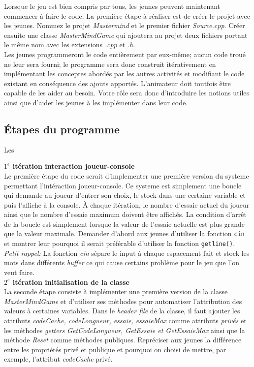 \documentclass[]{report}
\begin{document}
\begin{adjustwidth}{1.5cm}{0cm}
Lorsque le jeu est bien compris par tous, les jeunes peuvent maintenant commencer à faire le code. La première étape à réaliser est de créer le projet avec les jeunes. Nommez le projet \textit{Mastermind} et le premier fichier \textit{Source.cpp}. Créer ensuite une classe \textit{MasterMindGame} qui ajoutera au projet deux fichiers portant le même nom avec les extensions \textit{.cpp} et \textit{.h}.
\\

Les jeunes programmeront le code entièrement par eux-même; aucun code troué ne leur sera fourni; le programme sera donc construit itérativement en implémentant les conceptes abordés par les autres activités et modifiant le code existant en conséquence des ajouts apportés. L'animateur doit toutfois être capable de les aider au besoin. Votre rôle sera donc d'introduire les notions utiles ainsi que d'aider les jeunes à les implémenter dans leur code. 

\subsection*{\Large{Étapes du programme}}
\vspace{-5mm}\makebox[0.917\textwidth]{\hrulefill}\vspace{3mm}
Les 

\textbf{$1^e$ itération interaction joueur-console}\\
Le première étape du code serait d'implementer une première version du systeme permettant l'intéraction joueur-console. Ce systeme est simplement une boucle qui demande au joueur d'entrer son choix, le stock dans une certaine variable et puis l'affiche à la console. À chaque itération, le nombre d'essaie actuel du joueur ainsi que le nombre d'essaie maximum doivent être affichés. La condition d'arrêt de la boucle est simplement lorsque la valeur de l'essaie actuelle est plus grande que la valeur maximale. Demander d'abord aux jeunes d'utiliser la fonction \texttt{cin} et montrer leur pourquoi il serait préférable d'utiliser la fonction \texttt{getline()}.\\[6pt]
\textit{Petit rappel:} La fonction \textit{cin} sépare le input à chaque espacement fait et stock les mots dans différents \textit{buffer} ce qui cause certains problème pour le jeu que l'on veut faire.\\

\textbf{$2^e$ itération initialisation de la classe}\\
La seconde étape consiste à implémenter une première version de la classe \textit{MasterMindGame} et d'utiliser ses méthodes pour automatiser l'attribution des valeurs à certaines variables. Dans le \textit{header file} de la classe, il faut ajouter les attributs \textit{codeCache, codeLongueur, essaie, essaieMax} comme attributs \textit{privés} et les méthodes \textit{getters GetCodeLongueur, GetEssaie et GetEssaieMax} ainsi que la méthode \textit{Reset} comme méthodes publiques. Repréciser aux jeunes la différence entre les propriétés privé et publique et pourquoi on choisi de mettre, par exemple, l'attribut \textit{codeCache} privé.\\


\end{adjustwidth}
\end{document}
